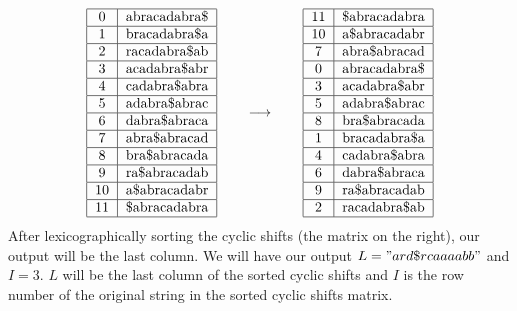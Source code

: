 \documentclass{article}
\begin{document}
{ 
\begin{equation*}
    \begin{tabular}{|c|c|}
    \hline
    0 & abracadabra\$ \\ \hline
    1 & bracadabra\$a \\ \hline
    2 & racadabra\$ab \\ \hline
    3 & acadabra\$abr \\ \hline
    4 & cadabra\$abra \\ \hline
    5 & adabra\$abrac \\ \hline
    6 & dabra\$abraca \\ \hline
    7 & abra\$abracad \\ \hline
    8 & bra\$abracada \\ \hline
    9 & ra\$abracadab \\ \hline
    10 & a\$abracadabr \\ \hline
    11 & \$abracadabra \\ \hline
    \end{tabular}
    \qquad \longrightarrow \qquad
    \begin{tabular}{|c|c|}
     \hline
    11 & \$abracadabra \\ \hline
    
    10 & a\$abracadabr \\ \hline
    7 & abra\$abracad \\ \hline
    0 & abracadabra\$ \\ \hline
    3 & acadabra\$abr \\ \hline
    5 & adabra\$abrac \\ \hline
    
    8 & bra\$abracada \\ \hline
    1 & bracadabra\$a \\ \hline
    
    4 & cadabra\$abra \\ \hline
    
    6 & dabra\$abraca \\ \hline
    
    9 & ra\$abracadab \\ \hline
    2 & racadabra\$ab \\ \hline
    \end{tabular}
\end{equation*}
}
After lexicographically sorting the cyclic shifts (the matrix on the right), our output will be the last column. We will have our output \(L = "ard\$rcaaaabb"\) and \(I = 3\). \(L\) will be the last column of the sorted cyclic shifts and \(I\) is the row number of the original string in the sorted cyclic shifts matrix. 
\end{document}

